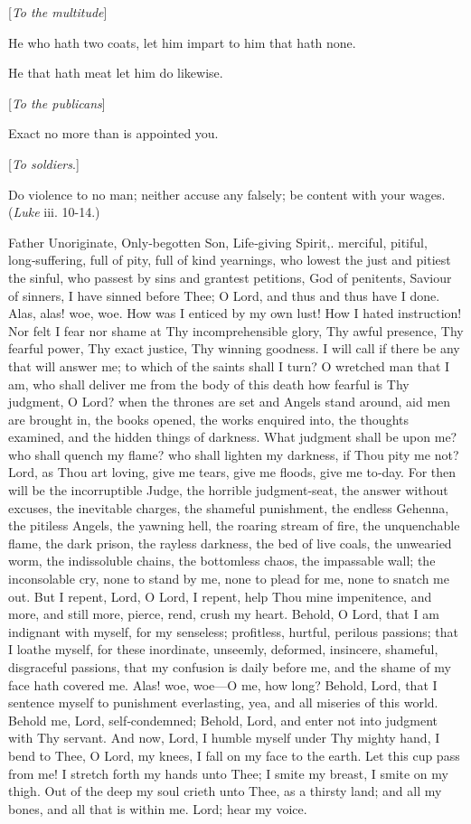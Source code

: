 [\emph{To the multitude}]

He who hath two coats, let him impart to him that hath none.

He that hath meat let him do likewise.

[\emph{To the publicans}]

Exact no more than is appointed you.

[\emph{To soldiers}.]

Do violence to no man; neither accuse any falsely; be content with your wages. (\emph{Luke} iii. 10-14.)


Father Unoriginate, Only‑begotten Son, Life‑giving Spirit,. merciful, pitiful, long‑suffering, full of pity, full of kind yearnings, who lowest the just and pitiest the sinful, who passest by sins and grantest petitions, God of penitents, Saviour of sinners, I have sinned before Thee; O Lord, and thus and thus have I done. Alas, alas! woe, woe. How was I enticed by my own lust! How I hated instruction! Nor felt I fear nor shame at Thy incomprehensible glory, Thy awful presence, Thy fearful power, Thy exact justice, Thy winning goodness. I will call if there be any that will answer me; to which of the saints shall I turn? O wretched man that I am, who shall deliver me from the body of this death how fearful is Thy judgment, O Lord? when the thrones are set and Angels stand around, aid men are brought in, the books opened, the works enquired into, the thoughts examined, and the hidden things of darkness. What judgment shall be upon me? who shall quench my flame? who shall lighten my darkness, if Thou pity me not? Lord, as Thou art loving, give me tears, give me floods, give me to‑day. For then will be the incorruptible Judge, the horrible judgment‑seat, the answer without excuses, the inevitable charges, the shameful punishment, the endless Gehenna, the pitiless Angels, the yawning hell, the roaring stream of fire, the unquenchable flame, the dark prison, the rayless darkness, the bed of live coals, the unwearied worm, the indissoluble chains, the bottomless chaos, the impassable wall; the inconsolable cry, none to stand by me, none to plead for me, none to snatch me out. But I repent, Lord, O Lord, I repent, help Thou mine impenitence, and more, and still more, pierce, rend, crush my heart. Behold, O Lord, that I am indignant with myself, for my senseless; profitless, hurtful, perilous passions; that I loathe myself, for these inordinate, unseemly, deformed, insincere, shameful, disgraceful passions, that my confusion is daily before me, and the shame of my face hath covered me. Alas! woe, woe—O me, how long? Behold, Lord, that I sentence myself to punishment everlasting, yea, and all miseries of this world. Behold me, Lord, self‑condemned; Behold, Lord, and enter not into judgment with Thy servant. And now, Lord, I humble myself under Thy mighty hand, I bend to Thee, O Lord, my knees, I fall on my face to the earth. Let this cup pass from me! I stretch forth my hands unto Thee; I smite my breast, I smite on my thigh. Out of the deep my soul crieth unto Thee, as a thirsty land; and all my bones, and all that is within me. Lord; hear my voice.

